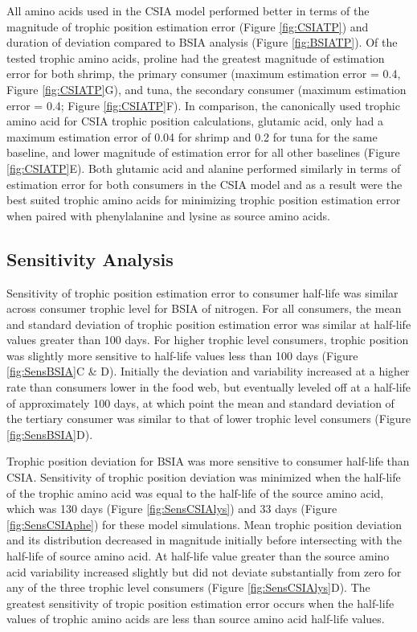 \documentclass [11pt, proquest] {uwthesis}[2015/03/03]
\begin{document}
All amino acids used in the CSIA model performed better in terms of the
magnitude of trophic position estimation error (Figure \ref{fig:CSIATP})
and duration of deviation compared to BSIA analysis (Figure
\ref{fig:BSIATP}). Of the tested trophic amino acids, proline had the
greatest magnitude of estimation error for both shrimp, the primary
consumer (maximum estimation error = 0.4, Figure \ref{fig:CSIATP}G), and
tuna, the secondary consumer (maximum estimation error = 0.4; Figure
\ref{fig:CSIATP}F). In comparison, the canonically used trophic amino
acid for CSIA trophic position calculations, glutamic acid, only had a
maximum estimation error of 0.04 for shrimp and 0.2 for tuna for the
same baseline, and lower magnitude of estimation error for all other
baselines (Figure \ref{fig:CSIATP}E). Both glutamic acid and alanine
performed similarly in terms of estimation error for both consumers in
the CSIA model and as a result were the best suited trophic amino acids
for minimizing trophic position estimation error when paired with
phenylalanine and lysine as source amino acids.

\subsection{Sensitivity Analysis}\label{sensitivity-analysis-1}

Sensitivity of trophic position estimation error to consumer half-life
was similar across consumer trophic level for BSIA of nitrogen. For all
consumers, the mean and standard deviation of trophic position
estimation error was similar at half-life values greater than 100 days.
For higher trophic level consumers, trophic position was slightly more
sensitive to half-life values less than 100 days (Figure
\ref{fig:SensBSIA}C \& D). Initially the deviation and variability
increased at a higher rate than consumers lower in the food web, but
eventually leveled off at a half-life of approximately 100 days, at
which point the mean and standard deviation of the tertiary consumer was
similar to that of lower trophic level consumers (Figure
\ref{fig:SensBSIA}D).

Trophic position deviation for BSIA was more sensitive to consumer
half-life than CSIA. Sensitivity of trophic position deviation was
minimized when the half-life of the trophic amino acid was equal to the
half-life of the source amino acid, which was 130 days (Figure
\ref{fig:SensCSIAlys}) and 33 days (Figure \ref{fig:SensCSIAphe}) for
these model simulations. Mean trophic position deviation and its
distribution decreased in magnitude initially before intersecting with
the half-life of source amino acid. At half-life value greater than the
source amino acid variability increased slightly but did not deviate
substantially from zero for any of the three trophic level consumers
(Figure \ref{fig:SensCSIAlys}D). The greatest sensitivity of tropic
position estimation error occurs when the half-life values of trophic
amino acids are less than source amino acid half-life values.
\end{document}
